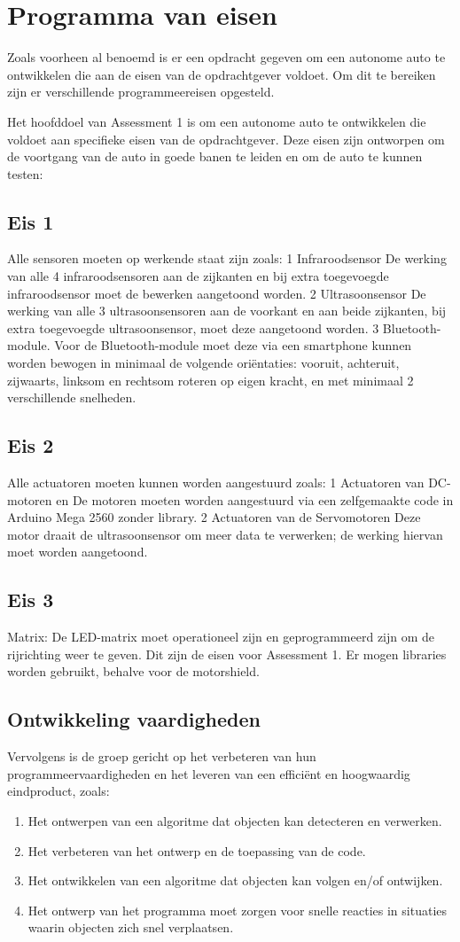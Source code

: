 \section{Programma van eisen}
Zoals voorheen al benoemd is er een opdracht gegeven om een autonome auto te ontwikkelen die aan de eisen van de opdrachtgever voldoet. Om dit te bereiken zijn er verschillende programmeereisen opgesteld.

Het hoofddoel van Assessment 1 is om een autonome auto te ontwikkelen die voldoet aan specifieke eisen van de opdrachtgever. Deze eisen zijn ontworpen om de voortgang van de auto in goede banen te leiden en om de auto te kunnen testen:
\subsection{Eis 1} Alle sensoren moeten op werkende staat zijn zoals:
1 Infraroodsensor 
De werking van alle 4 infraroodsensoren aan de zijkanten en bij extra toegevoegde infraroodsensor moet de bewerken aangetoond worden.
2	Ultrasoonsensor 
De werking van alle 3 ultrasoonsensoren aan de voorkant en aan beide zijkanten, bij extra toegevoegde ultrasoonsensor, moet deze  aangetoond worden.
3	Bluetooth-module. 
Voor de Bluetooth-module moet deze via een smartphone kunnen worden bewogen in minimaal de volgende oriëntaties: vooruit, achteruit, zijwaarts, linksom en rechtsom roteren op eigen kracht, en met minimaal 2 verschillende snelheden.
\subsection{Eis 2} Alle actuatoren moeten kunnen worden aangestuurd zoals:
1	Actuatoren  van DC-motoren en De motoren moeten worden aangestuurd via een zelfgemaakte code in Arduino Mega 2560 zonder library.
2	Actuatoren van de Servomotoren Deze motor draait de ultrasoonsensor om meer data te verwerken; de werking hiervan moet worden aangetoond.
\subsection{Eis 3}
Matrix:
De LED-matrix moet operationeel zijn en geprogrammeerd zijn om de rijrichting weer te geven.
Dit zijn de eisen voor Assessment 1. Er mogen libraries worden gebruikt, behalve voor de motorshield. 
\subsection{Ontwikkeling vaardigheden}
Vervolgens is de groep gericht op het verbeteren van hun programmeervaardigheden en het leveren van een efficiënt en hoogwaardig eindproduct, zoals:
\begin{enumerate}
    \item Het ontwerpen van een algoritme dat objecten kan detecteren en verwerken.
    \item Het verbeteren van het ontwerp en de toepassing van de code.
    \item Het ontwikkelen van een algoritme dat objecten kan volgen en/of ontwijken.
    \item Het ontwerp van het programma moet zorgen voor snelle reacties in situaties waarin objecten zich snel verplaatsen.
\end{enumerate}

